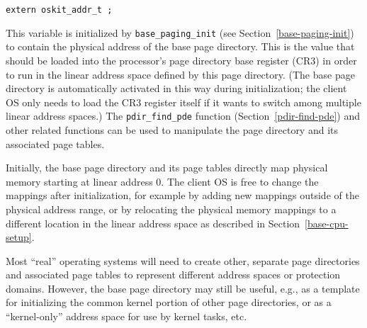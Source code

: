 \label{base-pdir-pa}
\begin{apisyn}

	{\tt extern oskit_addr_t ;}
\end{apisyn}
\begin{apidesc}
	This variable is initialized by {\tt base_paging_init}
	(see Section~\ref{base-paging-init})
	to contain the physical address of the base page directory.
	This is the value that should be loaded
	into the processor's page directory base register (CR3)
	in order to run in the linear address space
	defined by this page directory.
	(The base page directory is automatically activated in this way
	during initialization;
	the client OS only needs to load the CR3 register itself
	if it wants to switch among multiple linear address spaces.)
	The {\tt pdir_find_pde} function (Section~\ref{pdir-find-pde})
	and other related functions can be used
	to manipulate the page directory and its associated page tables.

	Initially, the base page directory and its page tables
	directly map physical memory starting at linear address 0.
	The client OS is free to change the mappings after initialization,
	for example by adding new mappings
	outside of the physical address range,
	or by relocating the physical memory mappings
	to a different location in the linear address space
	as described in Section~\ref{base-cpu-setup}.

	Most ``real'' operating systems
	will need to create other, separate page directories
	and associated page tables
	to represent different address spaces or protection domains.
	However, the base page directory may still be useful,
	e.g., as a template for initializing the common kernel portion
	of other page directories,
	or as a ``kernel-only'' address space for use by kernel tasks, etc.
\end{apidesc}

